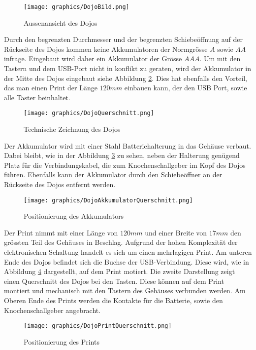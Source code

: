 \begin{figure}[h]
	\centering
	\texttt{[image: graphics/DojoBild.png]}
	\caption{Aussenansicht des Dojos}
	\label{fig:DojoBild}
\end{figure}

Durch den begrenzten Durchmesser und der begrenzten Schiebeöffnung auf der Rückseite des Dojos kommen keine Akkumulatoren der Normgrösse $A$ sowie $AA$ infrage. Eingebaut wird daher ein Akkumulator der Grösse $AAA$. Um mit den Tastern und dem USB-Port nicht in konflikt zu geraten, wird der Akkumulator in der Mitte des Dojos eingebaut siehe Abbildung \ref{fig:DojoQuerschnitt}. Dies hat ebenfalls den Vorteil, das man einen Print der Länge $120mm$ einbauen kann, der den USB Port, sowie alle Taster beinhaltet.

\begin{figure}[h]
	\centering
	\texttt{[image: graphics/DojoQuerschnitt.png]}
	\caption{Technische Zeichnung des Dojos}
	\label{fig:DojoQuerschnitt}
\end{figure}

\newpage

Der Akkumulator wird mit einer Stahl Batteriehalterung in das Gehäuse verbaut. Dabei bleibt, wie in der Abbildung \ref{fig:DojoAkkumulatorQuerschnitt} zu sehen, neben der Halterung genügend Platz für die Verbindungskabel, die zum Knochenschallgeber im Kopf des Dojos führen. Ebenfalls kann der Akkumulator durch den Schiebeöffner an der Rückseite des Dojos entfernt werden.

\begin{figure}[h]
	\centering
	\texttt{[image: graphics/DojoAkkumulatorQuerschnitt.png]}
	\caption{Positionierung des Akkumulators}
	\label{fig:DojoAkkumulatorQuerschnitt}
\end{figure}

Der Print nimmt mit einer Länge von $120mm$ und einer Breite von $17mm$ den grössten Teil des Gehäuses in Beschlag. Aufgrund der hohen Komplexität der elektronischen Schaltung handelt es sich um einen mehrlagigen Print. Am unteren Ende des Dojos befindet sich die Buchse der USB-Verbindung. Diese wird, wie in Abbildung \ref{fig:DojoPrintQuerschnitt} dargestellt, auf dem Print motiert. Die zweite Darstellung zeigt einen Querschnitt des Dojos bei den Tasten. Diese können auf dem Print montiert und mechanisch mit den Tastern des Gehäuses verbunden werden. Am Oberen Ende des Prints werden die Kontakte für die Batterie, sowie den Knochenschallgeber angebracht.

\begin{figure}[h]
	\centering
	\texttt{[image: graphics/DojoPrintQuerschnitt.png]}
	\caption{Positionierung des Prints}
	\label{fig:DojoPrintQuerschnitt}
\end{figure}


